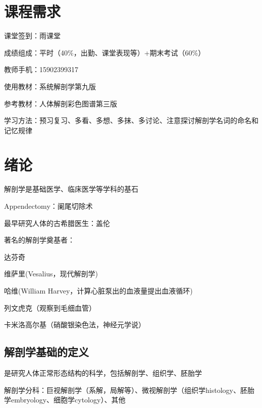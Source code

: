 \def\lecturer{周见至}
\def\noter{THF}
\def\term{III-B}
\def\className{Human Anatomy}



\maketitle
\tableofcontents
\section*{课程需求}%
\label{sec:课程需求}
课堂签到：雨课堂

成绩组成：平时（40\%，出勤、课堂表现等）+期末考试（60\%）

教师手机：15902399317

使用教材：系统解剖学第九版

参考教材：人体解剖彩色图谱第三版

学习方法：预习复习、多看、多想、多抹、多讨论、注意探讨解剖学名词的命名和记忆规律
\section{绪论}%
\label{sec:绪论}
解剖学是基础医学、临床医学等学科的基石
\begin{notation}
    Appendectomy：阑尾切除术
\end{notation}
\begin{notation}
    最早研究人体的古希腊医生：盖伦
\end{notation}
\begin{notation}
    著名的解剖学奠基者：

    达芬奇
    
    维萨里(Vesalius，现代解剖学)
    
    哈维(William Harvey，计算心脏泵出的血液量提出血液循环)
    
    列文虎克（观察到毛细血管）
    
    卡米洛高尔基（硝酸银染色法，神经元学说）
\end{notation}
\subsection{解剖学基础的定义}%
\label{sub:解剖学基础的定义}
是研究人体正常形态结构的科学，包括解剖学、组织学、胚胎学

解剖学分科：巨视解剖学（系解，局解等）、微视解剖学（组织学histology、胚胎学embryology、细胞学cytology）、其他

